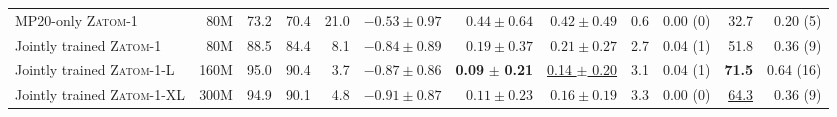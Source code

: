 \documentclass{article}
\theoremstyle{plain}
\theoremstyle{definition}
\theoremstyle{remark}
\begin{document}
\begin{table}[!ht]
{\begin{tabular}{@{}lrrrrrrrrrrr@{}}
    MP20-only \textsc{Zatom-1} & 80M   & 73.2                & 70.4          & 21.0          & $-0.53 \pm 0.97$ & $0.44 \pm 0.64$ & $0.42 \pm 0.49$ & 0.6 & 0.00 (0) & 32.7 & 0.20 (5)   \\
    Jointly trained \textsc{Zatom-1} & 80M             & 88.5             & 84.4          & 8.1          & $-0.84 \pm 0.89$ & \underline{$0.19 \pm 0.37$} & $0.21 \pm 0.27$ & 2.7 & 0.04 (1) & 51.8 & 0.36 (9) \\
    \rowcolor{orange!30} Jointly trained \textsc{Zatom-1-L} & 160M           & 95.0                & 90.4          & 3.7          & $-0.87 \pm 0.86$ & \textbf{0.09} $\pm$ \textbf{0.21} & \underline{0.14 $\pm$ 0.20} & 3.1 & 0.04 (1) & \textbf{71.5} & 0.64 (16) \\
    Jointly trained \textsc{Zatom-1-XL} & 300M          & 94.9                & 90.1          & 4.8          & \underline{$-0.91 \pm 0.87$} & $0.11 \pm 0.23$ & $0.16 \pm 0.19$ & 3.3 & 0.00 (0) & \underline{64.3} & 0.36 (9) \\
    \bottomrule
  \end{tabular}%
  }
\end{table}

\end{document}
